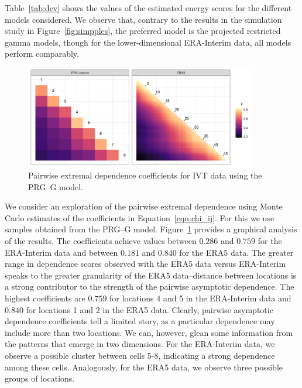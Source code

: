 Table~\ref{tab:dev} shows the values of the estimated energy 
    scores for the different models considered. We observe that, contrary to the results in the
    simulation study in Figure~\ref{fig:simpples}, the preferred model is the projected restricted 
    gamma models, though for the lower-dimensional ERA-Interim data, all models perform comparably.

\begin{figure}[htb]
    \centering
    \caption{Pairwise extremal dependence coefficients for IVT data using the PRG--G model.\label{fig:chi_ij}}
    \includegraphics[width=0.9\textwidth]{./images/chi_ij_c}
\end{figure}

We consider an exploration of the pairwise extremal dependence using Monte Carlo estimates of the 
  coefficients in  Equation~\ref{eqn:chi_ij}. For this we use samples obtained from the PRG--G model.
  Figure~\ref{fig:chi_ij} provides a graphical analysis of the results. 
  The coefficients achieve values between $0.286$ and $0.759$ for the ERA-Interim data and 
  between $0.181$ and $0.840$ for the ERA5 data.  The greater range in dependence scores observed 
  with the ERA5 data versus ERA-Interim speaks to the greater granularity of the ERA5 data--distance between locations is a strong contributor to the strength of the 
  pairwise asymptotic dependence. The highest coefficients are $0.759$ for 
  locations 4 and 5 in the ERA-Interim data and
  $0.840$ for locations 1 and 2 in the ERA5 data.  Clearly, pairwise asymptotic
  dependence coefficients tell a limited story, as a particular dependence may include
  more than two locations.   We can, however, glean some information from the patterns that
  emerge in two dimensions.  For the ERA-Interim data, we observe a possible cluster 
  between cells 5-8, indicating a strong dependence among these cells.  Analogously, for
  the ERA5 data, we observe three possible groups of locations.

